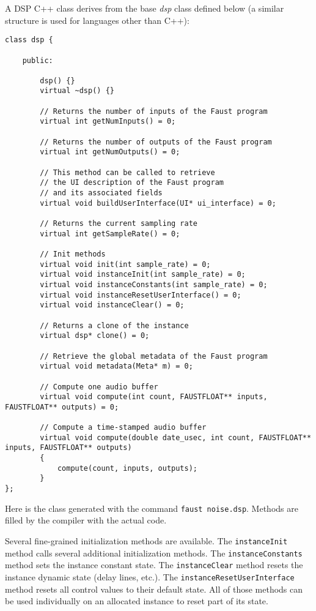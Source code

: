 A \faust DSP C++ class derives from the base \emph{dsp} class defined below (a similar structure is used for languages other than C++):
\begin{lstlisting}[basicstyle=\ttfamily\footnotesize\color{yotxt}]
class dsp {

    public:

        dsp() {}
        virtual ~dsp() {}

        // Returns the number of inputs of the Faust program
        virtual int getNumInputs() = 0;
        
        // Returns the number of outputs of the Faust program
        virtual int getNumOutputs() = 0;
        
        // This method can be called to retrieve 
        // the UI description of the Faust program
        // and its associated fields
        virtual void buildUserInterface(UI* ui_interface) = 0;
        
        // Returns the current sampling rate
        virtual int getSampleRate() = 0;
        
        // Init methods
        virtual void init(int sample_rate) = 0;
        virtual void instanceInit(int sample_rate) = 0;
        virtual void instanceConstants(int sample_rate) = 0;
        virtual void instanceResetUserInterface() = 0;
        virtual void instanceClear() = 0;
    
        // Returns a clone of the instance
        virtual dsp* clone() = 0;
    
        // Retrieve the global metadata of the Faust program
        virtual void metadata(Meta* m) = 0;
    
        // Compute one audio buffer
        virtual void compute(int count, FAUSTFLOAT** inputs, FAUSTFLOAT** outputs) = 0;
        
        // Compute a time-stamped audio buffer
        virtual void compute(double date_usec, int count, FAUSTFLOAT** inputs, FAUSTFLOAT** outputs) 
        { 
            compute(count, inputs, outputs); 
        }     
};
\end{lstlisting} 

Here is the class generated with the command \lstinline'faust noise.dsp'. Methods are filled by the compiler with the actual code. 

Several fine-grained initialization methods are available. The \lstinline'instanceInit' method calls several additional initialization methods. The \lstinline'instanceConstants' method sets the instance constant state. The \lstinline'instanceClear' method resets the instance dynamic state (delay lines, etc.).  The \lstinline'instanceResetUserInterface' method resets all control values to their default state. All of those methods can be used individually on an allocated instance to reset part of its state. 

